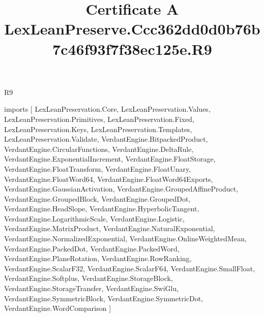 \begin{lexlean}{R9}
\title{Certificate A LexLeanPreserve.Ccc362dd0d0b76b7c46f93f7f38ec125e.R9}
\begin{coremodule}
imports [
  LexLeanPreservation.Core,
  LexLeanPreservation.Values,
  LexLeanPreservation.Primitives,
  LexLeanPreservation.Fixed,
  LexLeanPreservation.Keys,
  LexLeanPreservation.Templates,
  LexLeanPreservation.Validate,
  VerdantEngine.BitpackedProduct,
  VerdantEngine.CircularFunctions,
  VerdantEngine.DeltaRule,
  VerdantEngine.ExponentialIncrement,
  VerdantEngine.FloatStorage,
  VerdantEngine.FloatTransform,
  VerdantEngine.FloatUnary,
  VerdantEngine.FloatWord64,
  VerdantEngine.FloatWord64Exports,
  VerdantEngine.GaussianActivation,
  VerdantEngine.GroupedAffineProduct,
  VerdantEngine.GroupedBlock,
  VerdantEngine.GroupedDot,
  VerdantEngine.HeadSlope,
  VerdantEngine.HyperbolicTangent,
  VerdantEngine.LogarithmicScale,
  VerdantEngine.Logistic,
  VerdantEngine.MatrixProduct,
  VerdantEngine.NaturalExponential,
  VerdantEngine.NormalizedExponential,
  VerdantEngine.OnlineWeightedMean,
  VerdantEngine.PackedDot,
  VerdantEngine.PackedWord,
  VerdantEngine.PlaneRotation,
  VerdantEngine.RowRanking,
  VerdantEngine.ScalarF32,
  VerdantEngine.ScalarF64,
  VerdantEngine.SmallFloat,
  VerdantEngine.Softplus,
  VerdantEngine.StorageBlock,
  VerdantEngine.StorageTransfer,
  VerdantEngine.SwiGlu,
  VerdantEngine.SymmetricBlock,
  VerdantEngine.SymmetricDot,
  VerdantEngine.WordComparison
]


\end{coremodule}
\end{lexlean}
